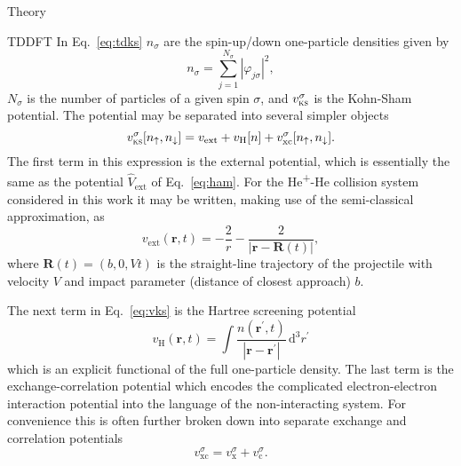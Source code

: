\documentclass[aps, pra, reprint, groupedaddress, amsfonts,
               amsmath, amssymb, showpacs, nofootinbib]{revtex4-1}
\begin{document}
\begin{section}{Theory \label{sec:theory}}
\begin{subsection}{TDDFT \label{sec:tddft}}
      In Eq.~\eqref{eq:tdks} $n_\sigma$ are the spin-up/down one-particle densities given by
      \begin{equation} \label{eq:spinden}
         n_\sigma = \sum\limits_{j=1}^{N_\sigma} \left| \varphi_{j\sigma} \right|^2,
      \end{equation}
      $N_\sigma$ is the number of particles of a given spin $\sigma$, and $v^\sigma_\textsc{ks}$ is the
      Kohn-Sham potential. The potential may be separated into several simpler objects
      \begin{equation} \label{eq:vks}
         v^\sigma_\mathrm{\textsc{ks}}[n_\uparrow, n_\downarrow] = v_\mathrm{ext} + v_\mathrm{H}[n]
                                                   + v^\sigma_\mathrm{xc}[n_\uparrow, n_\downarrow].
      \end{equation}
      The first term in this expression is the external potential, which is essentially the same as the
      potential $\hat{V}_\mathrm{ext}$ of Eq.~\eqref{eq:ham}. For the He\textsuperscript{+}-He
      collision system considered in this work it may be written, making use of the semi-classical
      approximation, as
      \begin{equation} \label{eq:hephe-ext}
         v_\mathrm{ext}(\mathbf{r},t) = -\frac{2}{r} 
         - \frac{2}{\left| \mathbf{r} - \mathbf{R}(t) \right|},
      \end{equation}
      where $\mathbf{R}(t) = (b,0,V t)$ is the straight-line trajectory of the projectile with velocity
      $V$ and impact parameter (distance of closest approach) $b$.
      
      The next term in Eq.~\eqref{eq:vks} is the Hartree screening potential
      \begin{equation} \label{eq:vh}
         v_\mathrm{H}(\mathbf{r},t) = \int \frac{n(\mathbf{r}^\prime, t)}
            {\left| \mathbf{r} - \mathbf{r}^\prime\right|} \, \mathrm{d}^3 r^\prime
      \end{equation}
      which is an explicit functional of the full one-particle density. The last term is the
      exchange-correlation potential which encodes the complicated electron-electron interaction
      potential into the language of the non-interacting system. For convenience this is often further
      broken down into separate exchange and correlation potentials
      \begin{equation} \label{eq:vxc}
         v^\sigma_\mathrm{xc} = v^\sigma_\mathrm{x} + v^\sigma_\mathrm{c}.
      \end{equation}


\end{subsection}
\end{section}
\end{document}
